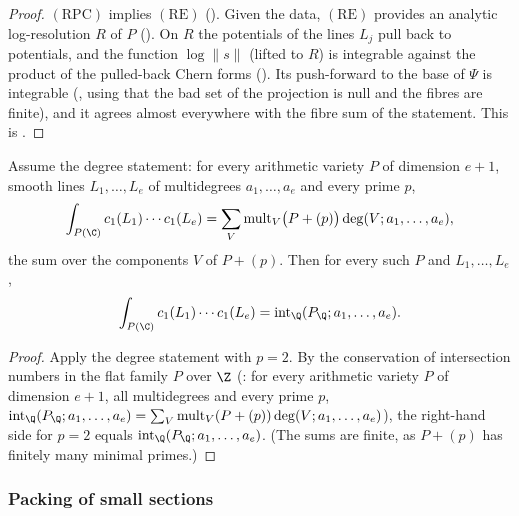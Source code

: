 \begin{proof}
$(\mathrm{RPC})$ implies $(\mathrm{RE})$ (). Given the data, $(\mathrm{RE})$
provides an analytic log-resolution $R$ of $P$ (). On $R$ the
potentials of the lines $L_j$ pull back to potentials, and the function $\log\|s\|$ (lifted to $R$) is integrable against the product of
the pulled-back Chern forms (). Its push-forward to the base of $\Psi$ is
integrable (, using that the bad set of the projection is
null and the fibres are finite), and it agrees almost everywhere with the fibre sum of the statement. This is
.
\end{proof}

\begin{proposition}\label{pf:sh-flag:deggen}
Assume the degree statement: for every arithmetic variety $P$ of dimension $e+1$, smooth lines $L_1,\dots,L_e$ of multidegrees
$a_1,\dots,a_e$ and every prime $p$,
\[
\int_{P(\C)}c_1(L_1)\cdots c_1(L_e)=\sum_{V}\mathrm{mult}_V\bigl(P+(p)\bigr)\deg(V;a_1,\dots,a_e),
\]
the sum over the components $V$ of $P+(p)$. Then for every such $P$ and $L_1,\dots,L_e$,
\[
\int_{P(\C)}c_1(L_1)\cdots c_1(L_e)=\mathrm{int}_\Q(P_\Q;a_1,\dots,a_e).
\]
\end{proposition}

\begin{proof}
Apply the degree statement with $p=2$. By the conservation of intersection numbers in the flat family $P$ over $\Z$
(: for every arithmetic variety $P$ of dimension $e+1$, all
multidegrees and every prime $p$, $\mathrm{int}_\Q(P_\Q;a_1,\dots,a_e)=\sum_V\mathrm{mult}_V(P+(p))\deg(V;a_1,\dots,a_e)$), the right-hand side
for $p=2$ equals $\mathrm{int}_\Q(P_\Q;a_1,\dots,a_e)$. (The sums are finite, as $P+(p)$ has finitely many minimal primes.)
\end{proof}

\subsubsection{Packing of small sections}

